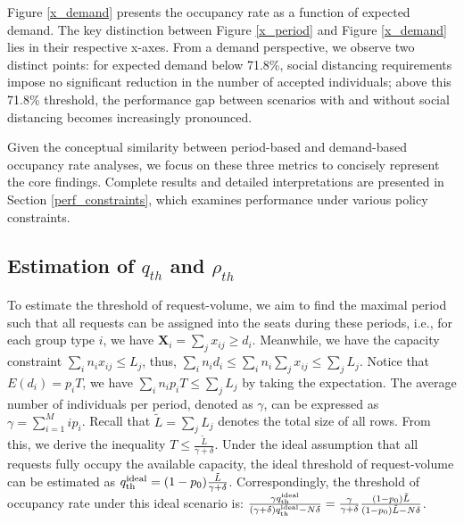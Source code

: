 


Figure \ref{x_demand} presents the occupancy rate as a function of expected demand. The key distinction between Figure \ref{x_period} and Figure \ref{x_demand} lies in their respective x-axes. From a demand perspective, we observe two distinct points: for expected demand below 71.8\%, social distancing requirements impose no significant reduction in the number of accepted individuals; above this 71.8\% threshold, the performance gap between scenarios with and without social distancing becomes increasingly pronounced.

Given the conceptual similarity between period-based and demand-based occupancy rate analyses, we focus on these three metrics to concisely represent the core findings. Complete results and detailed interpretations are presented in Section \ref{perf_constraints}, which examines performance under various policy constraints.


\subsection{Estimation of $q_{th}$ and $\rho_{th}$}
To estimate the threshold of request-volume, we aim to find the maximal period such that all requests can be assigned into the seats during these periods, i.e., for each group type $i$, we have $\bm{X}_{i} = \sum_{j} x_{ij} \geq d_i$. Meanwhile, we have the capacity constraint $\sum_{i} n_{i} x_{ij} \leq L_j$, thus, $\sum_{i} n_i d_i \leq \sum_{i} n_i \sum_{j} x_{ij} \leq \sum_{j} L_{j}$. Notice that $E(d_i) = p_i T$, we have $\sum_{i} n_i p_i T \leq \sum_{j} L_{j}$ by taking the expectation. The average number of individuals per period, denoted as $\gamma$, can be expressed as $\gamma = \sum_{i=1}^{M} i p_i$. Recall that $\tilde{L} = \sum_{j} L_{j}$ denotes the total size of all rows. From this, we derive the inequality $T \leq \frac{\tilde{L}}{\gamma + \delta}$. Under the ideal assumption that all requests fully occupy the available capacity, the ideal threshold of request-volume can be estimated as $q_{\textup{th}}^{\textup{ideal}} = (1-p_0) \frac{\tilde{L}}{\gamma + \delta}$. Correspondingly, the threshold of occupancy rate under this ideal scenario is: 
$\frac{\gamma q_{\textup{th}}^{\textup{ideal}}}{(\gamma+ \delta)q_{\textup{th}}^{\textup{ideal}} - N \delta} = \frac{\gamma}{\gamma +\delta} \frac{(1-p_0) \tilde{L}}{(1-p_0) \tilde{L}-N \delta}$. 


